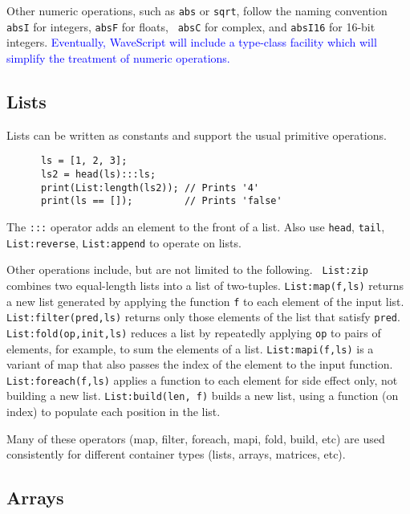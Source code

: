 \documentclass[twocolumn]{report}
\newcommand{\rednote}[1]{{\textcolor{blue}{#1}}}
\newcommand{\ws}{WaveScript}
\begin{document}
Other numeric operations, such as {\tt abs} or {\tt sqrt}, follow the
naming convention {\tt absI} for integers, {\tt absF} for floats, {\tt
absC} for complex, and {\tt absI16} for 16-bit integers.
\rednote{Eventually, {\ws} will include a type-class facility which
  will simplify the treatment of numeric operations.}



\subsection{Lists}

Lists can be written as constants and support the usual primitive
operations.  
\begin{verbatim}
      ls = [1, 2, 3];
      ls2 = head(ls):::ls;
      print(List:length(ls2)); // Prints '4'
      print(ls == []);         // Prints 'false'
\end{verbatim}

The {\tt :::} operator adds an element to the front of a list.  Also
use {\tt head}, {\tt tail}, {\tt List:reverse}, {\tt List:append} to operate on
lists.  

Other operations include, but are not limited to the following. {\tt
List:zip} combines two equal-length lists into a list of two-tuples.
{\tt List:map(f,ls)} returns a new list generated by applying the
function {\tt f} to each element of the input list.  {\tt
List:filter(pred,ls)} returns only those elements of the list that
satisfy {\tt pred}.  {\tt List:fold(op,init,ls)} reduces a list by
repeatedly applying {\tt op} to pairs of elements, for example, to sum
the elements of a list.  {\tt List:mapi(f,ls)} is a variant of map
that also passes the index of the element to the input function.  {\tt
List:foreach(f,ls)} applies a function to each element for side effect
only, not building a new list.  {\tt List:build(len, f)} builds a new
list, using a function (on index) to populate each position in the
list.

Many of these operators (map, filter, foreach, mapi, fold, build, etc) are used consistently
for different container types (lists, arrays, matrices, etc).

\subsection{Arrays}
\end{document}
